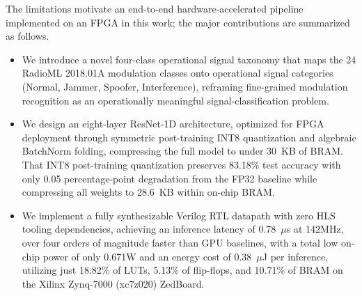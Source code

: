 \documentclass[conference]{IEEEtran}
\begin{document}

The limitations motivate an end-to-end hardware-accelerated pipeline implemented on an FPGA in this work; the major contributions are summarized as follows.
\begin{itemize}
    \item We introduce a novel four-class operational signal taxonomy that maps the 24 RadioML 2018.01A modulation classes onto operational signal categories (Normal, Jammer, Spoofer, Interference), reframing fine-grained modulation recognition as an operationally meaningful signal-classification problem.
    \item We design an eight-layer ResNet-1D architecture, optimized for FPGA deployment through symmetric post-training INT8 quantization and algebraic BatchNorm folding, compressing the full model to under 30~KB of BRAM. That INT8 post-training quantization preserves 83.18\% test accuracy with only 0.05 percentage-point degradation from the FP32 baseline while compressing all weights to 28.6~KB within on-chip BRAM.
    \item We implement a fully synthesizable Verilog RTL datapath with zero HLS tooling dependencies, achieving an inference latency of 0.78~$\mu$s at 142MHz, over four orders of magnitude faster than GPU baselines, with a total low on-chip power of only 0.671W and an energy cost of 0.38~$\mu$J per inference, utilizing just 18.82\% of LUTs, 5.13\% of flip-flops, and 10.71\% of BRAM on the Xilinx Zynq-7000 (xc7z020) ZedBoard.
\end{itemize}
\end{document}
